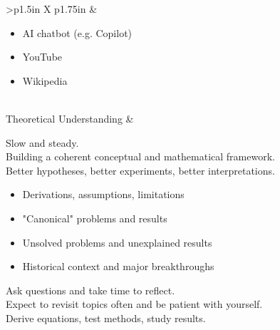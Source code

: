 \documentclass[8pt]{extarticle}
\begin{document}
\begin{tabularx}{\linewidth}{>{\bfseries}p{1.5in} X p{1.75in}}
                                                &   \begin{minipage}[t]{\linewidth}
                                                    \begin{itemize}[nosep,leftmargin=*]
                                                        \item AI chatbot (e.g. Copilot)
                                                        \item YouTube
                                                        \item Wikipedia
                                                    \end{itemize}
                                                    \end{minipage}
                                                            \\
    \addlinespace
    Theoretical Understanding   &   \begin{minipage}[t]{\linewidth}
                                    Slow and steady. \\
                                    Building a coherent conceptual and mathematical framework. \\
                                    Better hypotheses, better experiments, better interpretations.\vspace{0.5em}
                                    \begin{itemize}[nosep]
                                        \item Derivations, assumptions, limitations
                                        \item "Canonical" problems and results
                                        \item Unsolved problems and unexplained results
                                        \item Historical context and major breakthroughs
                                    \end{itemize} \vspace{0.5em}
                                    Ask questions and take time to reflect. \\
                                    Expect to revisit topics often and be patient with yourself. \\
                                    Derive equations, test methods, study results.
                                    \end{minipage}
                                    

\end{tabularx}
\end{document}

